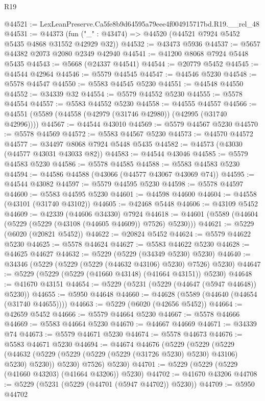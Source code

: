 \begin{lexlean}{R19}
\begin{coremodule}
@44521 := LexLeanPreserve.Ca5fe8b9d64595a79eee4f004915717bd.R19.__rel_48
@44531 := @44373 (fun ("_" : @43474) => @44520 (@44521 @7924 @5452 @5435 @4868 @31552 @42929 @32))
@44532 := @43473 @5936
@44537 := @5657 @44382 @2073 @2080 @2349 @42940
@44541 := @41200 @8068 @7924 @5448 @5435
@44543 := @5668 (@24337 @44541)
@44544 := @20779 @5452
@44545 := @44544 @42964
@44546 := @5579 @44545
@44547 := @44546 @5230
@44548 := @5578 @44547
@44550 := @5583 @44545 @5230
@44551 := @44548 @44550
@44552 := @34339 @32
@44554 := @5579 @44552 @5230
@44555 := @5578 @44554
@44557 := @5583 @44552 @5230
@44558 := @44555 @44557
@44566 := @44551 (@5589 (@44558 (@42979 (@31746 @42980)) (@42995 (@31740 @42996))))
@44567 := @44544 @43010
@44569 := @5579 @44567 @5230
@44570 := @5578 @44569
@44572 := @5583 @44567 @5230
@44573 := @44570 @44572
@44577 := @34497 @8068 @7924 @5448 @5435
@44582 := @44573 (@43030 (@44577 @43031 @43033 @82))
@44583 := @44544 @43046
@44585 := @5579 @44583 @5230
@44586 := @5578 @44585
@44588 := @5583 @44583 @5230
@44594 := @44586 @44588 (@43066 (@44577 @43067 @43069 @74))
@44595 := @44544 @43082
@44597 := @5579 @44595 @5230
@44598 := @5578 @44597
@44600 := @5583 @44595 @5230
@44601 := @44598 @44600
@44604 := @44558 (@43101 (@31740 @43102))
@44605 := @42468 @5448
@44606 := @43109 @5452
@44609 := @42339 (@44606 @34330) @7924
@44618 := @44601 (@5589 (@44604 (@5229 (@5229 (@43108 (@44605 @44609)) @7526) @5230)))
@44621 := @5229 (@6020 (@20821 @5452))
@44622 := @20824 @5452
@44624 := @5579 @44622 @5230
@44625 := @5578 @44624
@44627 := @5583 @44622 @5230
@44628 := @44625 @44627
@44632 := @5229 (@5229 (@34349 @5230) @5230)
@44640 := @34346 (@5229 (@5229 (@5229 (@44632 @43106) @5230) @7526) @5230)
@44647 := @5229 (@5229 (@5229 (@41660 @43148) (@41664 @43151)) @5230)
@44648 := @41670 @43151
@44654 := @5229 (@5231 (@5229 (@44647 (@5947 @44648)) @5230))
@44655 := @5950 @44648
@44660 := @44628 (@5589 (@44640 (@44654 (@31740 @44655))))
@44663 := @5229 (@6020 (@42656 @5452))
@44664 := @42659 @5452
@44666 := @5579 @44664 @5230
@44667 := @5578 @44666
@44669 := @5583 @44664 @5230
@44670 := @44667 @44669
@44671 := @34339 @74
@44673 := @5579 @44671 @5230
@44674 := @5578 @44673
@44676 := @5583 @44671 @5230
@44694 := @44674
    @44676
    (@5229
      (@5229
        (@5229
          (@44632 (@5229 (@5229 (@5229 (@5229 (@31726 @5230) @5230) @43106) @5230) @5230))
          @5230)
        @7526)
      @5230)
@44701 := @5229 (@5229 (@5229 (@41660 @43203) (@41664 @43206)) @5230)
@44702 := @41670 @43206
@44708 := @5229 (@5231 (@5229 (@44701 (@5947 @44702)) @5230))
@44709 := @5950 @44702

\end{coremodule}
\end{lexlean}
